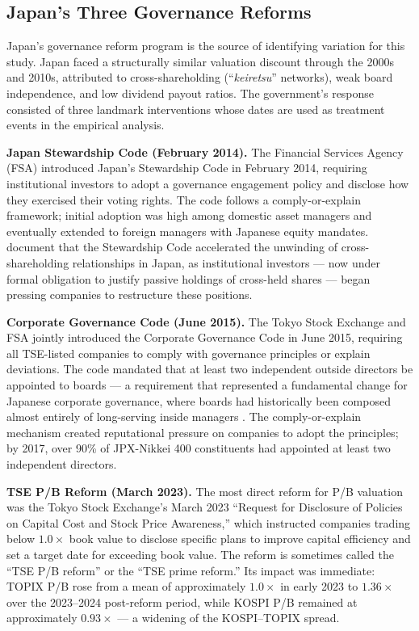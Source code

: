 \documentclass[12pt]{article}
\begin{document}
\subsection{Japan's Three Governance Reforms}
\label{subsec:japan_reforms}

Japan's governance reform program is the source of identifying variation for this study.
Japan faced a structurally similar valuation discount through the 2000s and 2010s, attributed
to cross-shareholding (``\textit{keiretsu}'' networks), weak board independence, and low
dividend payout ratios. The government's response consisted of three landmark interventions
whose dates are used as treatment events in the empirical analysis.

\textbf{Japan Stewardship Code (February 2014).} The Financial Services Agency (FSA)
introduced Japan's Stewardship Code in February 2014, requiring institutional investors to
adopt a governance engagement policy and disclose how they exercised their voting rights.
The code follows a comply-or-explain framework; initial adoption was high among domestic
asset managers and eventually extended to foreign managers with Japanese equity mandates.
\citet{miyajima2023} document that the Stewardship Code accelerated the unwinding of
cross-shareholding relationships in Japan, as institutional investors --- now under formal
obligation to justify passive holdings of cross-held shares --- began pressing companies to
restructure these positions.

\textbf{Corporate Governance Code (June 2015).} The Tokyo Stock Exchange and FSA jointly
introduced the Corporate Governance Code in June 2015, requiring all TSE-listed companies
to comply with governance principles or explain deviations. The code mandated that at
least two independent outside directors be appointed to boards --- a requirement that
represented a fundamental change for Japanese corporate governance, where boards had
historically been composed almost entirely of long-serving inside managers
\citep{eberhart2012}. The comply-or-explain mechanism created reputational pressure on
companies to adopt the principles; by 2017, over 90\% of JPX-Nikkei 400 constituents had
appointed at least two independent directors.

\textbf{TSE P/B Reform (March 2023).} The most direct reform for P/B valuation was the
Tokyo Stock Exchange's March 2023 ``Request for Disclosure of Policies on Capital Cost and
Stock Price Awareness,'' which instructed companies trading below $1.0\times$ book value to
disclose specific plans to improve capital efficiency and set a target date for exceeding
book value. The reform is sometimes called the ``TSE P/B reform'' or the ``TSE prime reform.''
Its impact was immediate: TOPIX P/B rose from a mean of approximately $1.0\times$ in early
2023 to $1.36\times$ over the 2023--2024 post-reform period, while KOSPI P/B remained at
approximately $0.93\times$ --- a widening of the KOSPI--TOPIX spread.
\end{document}
